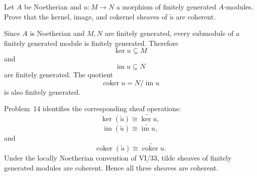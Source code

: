 \begin{problem}\label{prob:vi33-18}
Let \(A\) be Noetherian and \(u:M\to N\) a morphism of finitely generated \(A\)-modules. Prove that the kernel,
image, and cokernel sheaves of \(\widetilde u\) are coherent.

\end{problem}

\ifdefined\FullProblemDossiers
\begin{solution}
Since \(A\) is Noetherian and \(M,N\) are finitely generated, every submodule of a finitely generated module is
finitely generated. Therefore
\[
\ker u\subseteq M
\]
and
\[
\operatorname{im}u\subseteq N
\]
are finitely generated. The quotient
\[
\operatorname{coker}u=N/\operatorname{im}u
\]
is also finitely generated.

Problem~14 identifies the corresponding sheaf operations:
\[
\ker(\widetilde u)\cong\widetilde{\ker u},
\]
\[
\operatorname{im}(\widetilde u)\cong\widetilde{\operatorname{im}u},
\]
and
\[
\operatorname{coker}(\widetilde u)\cong\widetilde{\operatorname{coker}u}.
\]
Under the locally Noetherian convention of VI/33, tilde sheaves of finitely generated modules are coherent.
Hence all three sheaves are coherent.
\end{solution}
\fi
